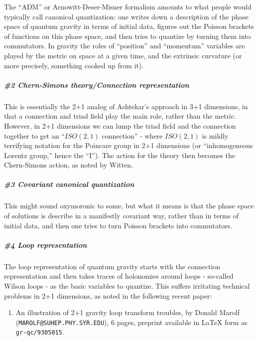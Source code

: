 \documentclass{article}
\def\tightlist{}
\begin{document}
The ``ADM'' or Arnowitt-Deser-Misner formalism amounts to what people
would typically call canonical quantization: one writes down a
description of the phase space of quantum gravity in terms of initial
data, figures out the Poisson brackets of functions on this phase space,
and then tries to quantize by turning them into commutators. In gravity
the roles of ``position'' and ``momentum'' variables are played by the
metric on space at a given time, and the extrinsic curvature (or more
precisely, something cooked up from it).

\hypertarget{chern-simons-theoryconnection-representation}{%
\subparagraph{\#2 Chern-Simons theory/Connection
representation}\label{chern-simons-theoryconnection-representation}}

This is essentially the 2+1 analog of Ashtekar's approach in 3+1
dimensions, in that a connection and triad field play the main role,
rather than the metric. However, in 2+1 dimensions we can lump the triad
field and the connection together to get an ``\(ISO(2,1)\) connection''
- where \(ISO(2,1)\) is mildly terrifying notation for the Poincare
group in 2+1 dimensions (or ``inhomogeneous Lorentz group,'' hence the
``I''). The action for the theory then becomes the Chern-Simons action,
as noted by Witten.

\hypertarget{covariant-canonical-quantization}{%
\subparagraph{\#3 Covariant canonical
quantization}\label{covariant-canonical-quantization}}

This might sound oxymoronic to some, but what it means is that the phase
space of solutions is describe in a manifestly covariant way, rather
than in terms of initial data, and then one tries to turn Poisson
brackets into commutators.

\hypertarget{loop-representation}{%
\subparagraph{\#4 Loop representation}\label{loop-representation}}

The loop representation of quantum gravity starts with the connection
representation and then takes traces of holonomies around loops -
so-called Wilson loops - as the basic variables to quantize. This
suffers irritating technical problems in 2+1 dimensions, as noted in the
following recent paper:

\begin{enumerate}
\def\labelenumi{\arabic{enumi})}
\setcounter{enumi}{4}
\tightlist
\item
  An illustration of 2+1 gravity loop transform troubles, by Donald
  Marolf (\texttt{MAROLF@SUHEP.PHY.SYR.EDU}), 6 pages, preprint
  available in LaTeX form as \texttt{gr-qc/9305015}.
\end{enumerate}
\end{document}
